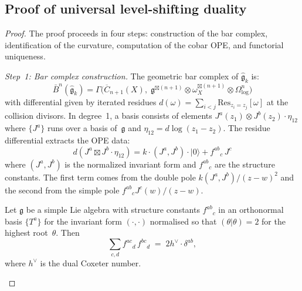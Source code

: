 \subsection{Proof of universal level-shifting duality}

\begin{proof}
The proof proceeds in four steps: construction of the bar complex, identification of the curvature, computation of the cobar OPE, and functorial uniqueness.

\emph{Step~1: Bar complex construction.}
The geometric bar complex of $\widehat{\mathfrak{g}}_k$ is:
\begin{equation}
\bar{B}^n(\widehat{\mathfrak{g}}_k) = \Gamma\bigl(\overline{C}_{n+1}(X),\; \mathfrak{g}^{\boxtimes(n+1)} \otimes \omega_X^{\boxtimes(n+1)} \otimes \Omega^n_{\log}\bigr)
\end{equation}
with differential given by iterated residues $d(\omega) = \sum_{i < j} \mathrm{Res}_{z_i=z_j}[\omega]$ at the collision divisors. In degree~1, a basis consists of elements $J^a(z_1) \otimes J^b(z_2) \cdot \eta_{12}$ where $\{J^a\}$ runs over a basis of~$\mathfrak{g}$ and $\eta_{12} = d\log(z_1 - z_2)$. The residue differential extracts the OPE data:
\begin{equation}\label{eq:bar-diff-general}
d(J^a \boxtimes J^b \cdot \eta_{12}) = k \cdot (J^a, J^b) \cdot |0\rangle + f^{ab}{}_{c}\, J^c
\end{equation}
where $(J^a, J^b)$ is the normalized invariant form and $f^{ab}{}_c$ are the structure constants. The first term comes from the double pole $k(J^a, J^b)/(z-w)^2$ and the second from the simple pole $f^{ab}{}_c J^c(w)/(z-w)$.

\begin{lemma}\label{lem:killing-structure-constants}
Let $\mathfrak{g}$ be a simple Lie algebra with structure
constants $f^{ab}{}_{c}$ in an orthonormal basis
$\{T^a\}$ for the invariant form $(\cdot,\cdot)$
normalised so that $(\theta|\theta) = 2$ for the
highest root~$\theta$. Then
\begin{equation}\label{eq:killing-structure-constants}
\sum_{c,d} f^{ac}{}_{d}\, f^{bc}{}_{d}
\;=\; 2h^\vee \cdot \delta^{ab},
\end{equation}
where $h^\vee$ is the dual Coxeter number.
\end{lemma}


\end{proof}
